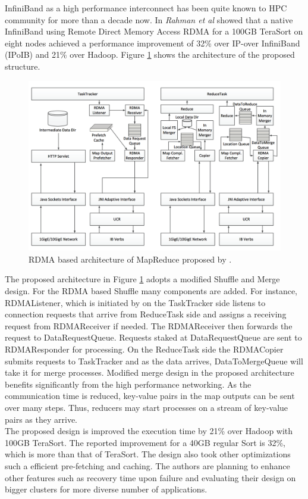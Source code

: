 \documentclass[runningheads,a4paper]{llncs}
\begin{document}
{InfiniBand as a high performance interconnect has been quite known to HPC community for more than a decade now. In \cite{wasi2013high} \textit{Rahman et al} showed that a native InfiniBand using Remote Direct Memory Access RDMA for a 100GB TeraSort on eight nodes achieved a performance improvement of 32\% over IP-over InfiniBand (IPoIB) and 21\% over Hadoop. Figure \ref{fig:RDMA_hadoop} shows the architecture of the proposed structure.
\begin{figure}[!htb]
	\includegraphics[width=\textwidth]{./images/RDMA_Hadoop}
	\centering
	\caption{RDMA based architecture of MapReduce proposed by \cite{wasi2013high}.}
	\label{fig:RDMA_hadoop}
\end{figure}
The proposed architecture in Figure \ref{fig:RDMA_hadoop} adopts a modified Shuffle and Merge design. For the RDMA based Shuffle many components are added. For instance, RDMAListener, which is initiated by on the TaskTracker side listens to connection requests that arrive from ReduceTask side and assigns a receiving request from RDMAReceiver if needed. The RDMAReceiver then forwards the request to DataRequestQueue. Requests staked at DataRequestQueue are sent to RDMAResponder for processing. On the ReduceTask side the RDMACopier submits requests to TaskTracker and as the data arrives, DataToMergeQueue will take it for merge processes. Modified merge design in the proposed architecture benefits significantly from the high performance networking. As the communication time is reduced, key-value pairs in the map outputs can be sent over many steps. Thus, reducers may start processes on a stream of key-value pairs as they arrive.\\

The proposed design is improved the execution time by 21\% over Hadoop with 100GB TeraSort. The reported improvement for a 40GB regular Sort is 32\%, which is more than that of TeraSort. The design also took other optimizations such a efficient pre-fetching and caching. The authors are planning to enhance other features such as recovery time upon failure and evaluating their design on bigger clusters for more diverse number of applications.\\

}
\end{document}
